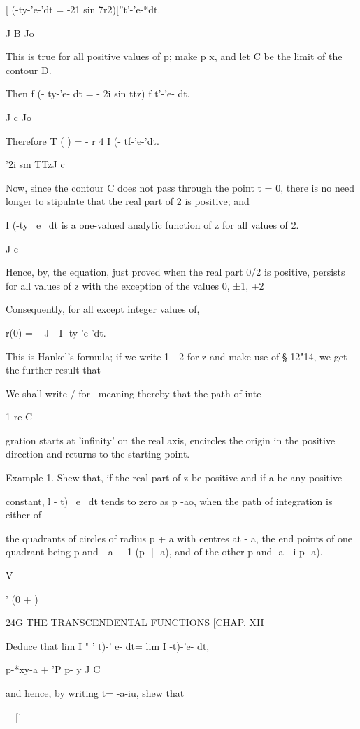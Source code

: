 [ (-ty-'e-'dt = -21 sin 7r2)[''t'-'e-*dt.

J B Jo

This is true for all positive values of p; make p x, and let C be
the limit of the contour D.

Then f (- ty-'e- dt = - 2i sin ttz) f t'-'e- dt.

J c Jo

Therefore T ( ) = - r 4 I (- tf-'e-'dt.

'2i sm TTzJ c

Now, since the contour C does not pass through the point t = 0, there
is no need longer to stipulate that the real part of 2 is positive;
and

I (-ty~ e~ dt is a one-valued analytic function of z for all values of
2.

J c

Hence, by, the equation, just proved when the real part 0/2 is
positive, persists for all values of z with the exception of the
values 0, ±1, +2

Consequently, for all except integer values of,

r(0) = -\ J - I -ty-'e-'dt.

This is Hankel's formula; if we write 1 - 2 for z and make use of §
12"14, we get the further result that

We shall write / for \, meaning thereby that the path of inte-

1 re C

gration starts at 'infinity' on the real axis, encircles the origin in
the positive direction and returns to the starting point.

Example 1. Shew that, if the real part of z be positive and if a be
any positive

constant, l - t)~ e~ dt tends to zero as p -ao, when the path of
integration is either of

the quadrants of circles of radius p + a with centres at - a, the end
points of one quadrant being p and - a + 1 (p -|- a), and of the other
p and -a - i p- a).

V

' (0 + )

24G THE TRANSCENDENTAL FUNCTIONS [CHAP. XII

Deduce that lim I " ' t)-' e- dt= lim I -t)-'e- dt,

p-*xy-a + 'P p- y J C

and hence, by writing t= -a-iu, shew that

\ \ ['

